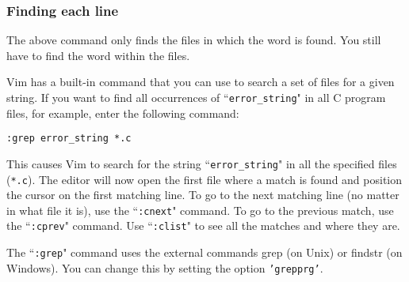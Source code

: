 \subsubsection{Finding each line}
The above command only finds the files in which the word is found.
You still have to find the word within the files.

Vim has a built-in command that you can use to search a set of files for a given string.
If you want to find all occurrences of ``\texttt{error\_string}" in all C program files, for example, enter the following command:

\begin{Verbatim}[samepage=true]
 :grep error_string *.c
\end{Verbatim}

This causes Vim to search for the string ``\texttt{error\_string}" in all the specified files (\texttt{*.c}).
The editor will now open the first file where a match is found and position the cursor on the first matching line.
To go to the next matching line (no matter in what file it is), use the ``\texttt{:cnext}" command.
To go to the previous match, use the ``\texttt{:cprev}" command.
Use ``\texttt{:clist}" to see all the matches and where they are.

The ``\texttt{:grep}" command uses the external commands grep (on Unix) or findstr (on Windows).
You can change this by setting the option \texttt{'grepprg'}.
\clearpage
